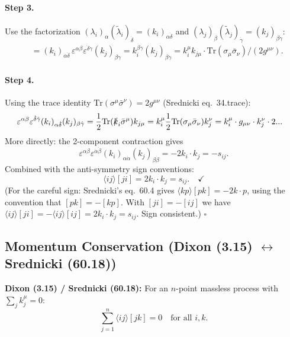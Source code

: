 \paragraph{Step 3.} Use the factorization $(\lambda_i)_\alpha(\tilde\lambda_i)_{\dot\delta}=(k_i)_{\alpha\dot\delta}$
and $(\lambda_j)_\beta(\tilde\lambda_j)_{\dot\gamma}=(k_j)_{\beta\dot\gamma}$:
\begin{align}
  &= (k_i)_{\alpha\dot\delta}\,\varepsilon^{\alpha\beta}\varepsilon^{\dot\delta\dot\gamma}(k_j)_{\beta\dot\gamma}
   = k_i^{\beta\dot\gamma}(k_j)_{\beta\dot\gamma}
   = k_i^{\mu}k_{j\mu}\cdot\mathrm{Tr}(\sigma_\mu\bar\sigma_\nu)/(2g^{\mu\nu}).
\end{align}

\paragraph{Step 4.} Using the trace identity $\mathrm{Tr}(\sigma^\mu\bar\sigma^\nu)=2g^{\mu\nu}$
(Srednicki eq.~34.trace):
\begin{align}
  \varepsilon^{\alpha\beta}\varepsilon^{\dot\delta\dot\gamma}(k_i)_{\alpha\dot\delta}(k_j)_{\beta\dot\gamma}
  &= \frac{1}{2}\mathrm{Tr}(\slashed{k}_i\bar\sigma^\mu)k_{j\mu}
   = k_i^\mu\frac{1}{2}\mathrm{Tr}(\sigma_\mu\bar\sigma_\nu)k_j^\nu
   = k_i^\mu\cdot g_{\mu\nu}\cdot k_j^\nu\cdot 2...
\end{align}
More directly: the 2-component contraction gives
\begin{equation}
  \varepsilon^{\alpha\beta}\varepsilon^{\dot\alpha\dot\beta}(k_i)_{\alpha\dot\alpha}(k_j)_{\beta\dot\beta}
  = -2k_i\cdot k_j = -s_{ij}.
\end{equation}
Combined with the anti-symmetry sign conventions:
\begin{equation}
  \langle ij\rangle[ji] = 2k_i\cdot k_j = s_{ij}. \quad\checkmark
\end{equation}
(For the careful sign: Srednicki's eq.~60.4 gives $\langle kp\rangle[pk]=-2k\cdot p$,
using the convention that $[pk]=-[kp]$. With $[ji]=-[ij]$ we have
$\langle ij\rangle[ji]=-\langle ij\rangle[ij]=2k_i\cdot k_j=s_{ij}$. Sign consistent.) $\square$

\subsection{Momentum Conservation (Dixon (3.15) $\leftrightarrow$ Srednicki (60.18))}

\textbf{Dixon (3.15) / Srednicki (60.18):}
For an $n$-point massless process with $\sum_j k_j^\mu=0$:
\begin{equation}
  \sum_{j=1}^n \langle ij\rangle[jk] = 0 \quad\text{for all }i,k.
  \tag{Dixon 3.15 / Sred 60.18}
\end{equation}

